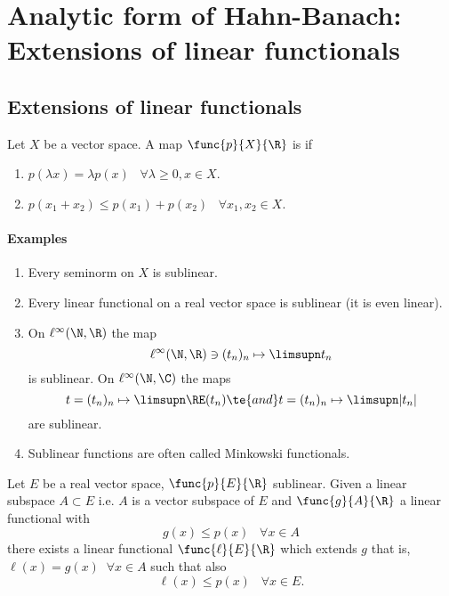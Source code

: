\section{Analytic form of Hahn-Banach: Extensions of linear functionals}
\subsection{Extensions of linear functionals}
\begin{definition}\label{iv.1}
    Let $X$ be a vector space. A map $\func{p}{X}{\R}$ is  if
    \begin{enumerate}[label=\alph*)]
        \item $p(\lambda x)=\lambda p(x)\;\;\;\forall\lambda\geq0,x\in X$.
        \item $p(x_1+x_2)\leq p(x_1)+p(x_2)\;\;\;\forall x_1,x_2\in X$.
    \end{enumerate}
\end{definition}

\paragraph{Examples}
\begin{enumerate}[label=\arabic*)]
    \item Every seminorm on $X$ is sublinear.
    \item Every linear functional on a real vector space is sublinear (it is even linear).
    \item On $\ell^\infty(\N,\R)$ the map
        \[\ell^\infty(\N,\R)\ni (t_n)_n\mapsto\limsupn t_n\]
        is sublinear. On $\ell^\infty(\N,\C)$ the maps
        \[t=(t_n)_n\mapsto\limsupn\RE(t_n)\te{ and }t=(t_n)_n\mapsto\limsupn|t_n|\]
        are sublinear.
    \item Sublinear functions are often called Minkowski functionals.
\end{enumerate}

\begin{thm}\label{iv.2}
    Let $E$ be a real vector space, $\func{p}{E}{\R}$ sublinear. Given a linear subspace $A\subset E$ \rec{(}i.e. $A$ is a vector subspace of $E$\rec{)} and $\func{g}{A}{\R}$ a linear functional with
    \[g(x)\leq p(x)\;\;\;\forall x\in A\tag{4.1}\label{4.1}\]
    there exists a linear functional $\func{\ell}{E}{\R}$ which extends $g$ \rec{(}that is, $\ell(x)=g(x)\;\;\forall x\in A$\rec{)} such that also
    \[\ell(x)\leq p(x)\;\;\;\forall x\in E.\tag{4.2}\label{4.2}\]
\end{thm}

